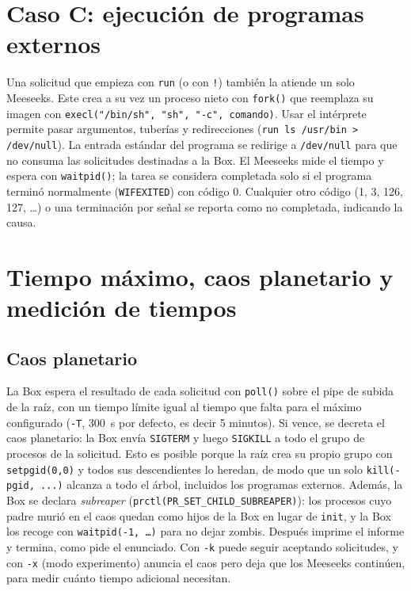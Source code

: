 \documentclass[11pt,letterpaper]{article}
\makeatletter
\newcommand{\codigo}[2]{%
  \edef\lin{\csname line@#1\endcsname}%
  }
\makeatother
\begin{document}
\codigo{pmul}{Nivel multiplicativo del analizador (con detección de división entre cero)}
\codigo{evaluate}{Punto de entrada del evaluador}

\section{Caso C: ejecución de programas externos}\label{sec:c}

Una solicitud que empieza con \texttt{run} (o con \texttt{!}) también la atiende un solo
Meeseeks. Este crea a su vez un proceso nieto con \texttt{fork()} que reemplaza su imagen
con \texttt{execl("/bin/sh", "sh", "-c", comando)}. Usar el intérprete permite pasar
argumentos, tuberías y redirecciones (\texttt{run ls /usr/bin > /dev/null}). La entrada
estándar del programa se redirige a \texttt{/dev/null} para que no consuma las solicitudes
destinadas a la Box. El Meeseeks mide el tiempo y espera con \texttt{waitpid()}; la tarea
se considera completada solo si el programa terminó normalmente
(\texttt{WIFEXITED}) con código 0. Cualquier otro código (1, 3, 126, 127, \dots) o una
terminación por señal se reporta como no completada, indicando la causa.

\codigo{run}{Ejecución de un programa externo}

\section{Tiempo máximo, caos planetario y medición de tiempos}\label{sec:caos}

\subsection{Caos planetario}

La Box espera el resultado de cada solicitud con \texttt{poll()} sobre el pipe de subida
de la raíz, con un tiempo límite igual al tiempo que falta para el máximo configurado
(\texttt{-T}, 300~s por defecto, es decir 5 minutos). Si vence, se decreta el caos
planetario: la Box envía \texttt{SIGTERM} y luego \texttt{SIGKILL} a todo el grupo de
procesos de la solicitud. Esto es posible porque la raíz crea su propio grupo con
\texttt{setpgid(0,0)} y todos sus descendientes lo heredan, de modo que un solo
\texttt{kill(-pgid, ...)} alcanza a todo el árbol, incluidos los programas externos. Además,
la Box se declara \emph{subreaper} (\texttt{prctl(PR\_SET\_CHILD\_SUBREAPER)}): los procesos
cuyo padre murió en el caos quedan como hijos de la Box en lugar de \texttt{init}, y la Box
los recoge con \texttt{waitpid(-1, \dots)} para no dejar zombis. Después imprime el informe
y termina, como pide el enunciado. Con \texttt{-k} puede seguir aceptando solicitudes, y
con \texttt{-x} (modo experimento) anuncia el caos pero deja que los Meeseeks continúen,
para medir cuánto tiempo adicional necesitan.
\end{document}
